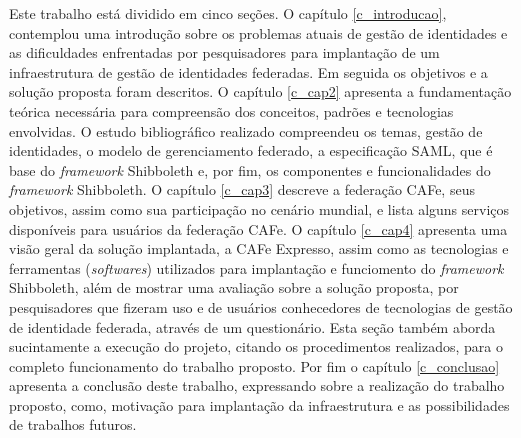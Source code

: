 Este trabalho está dividido em cinco seções. O capítulo \ref{c_introducao}, contemplou uma introdução sobre os problemas atuais de gestão de identidades e as dificuldades enfrentadas por pesquisadores para implantação de um infraestrutura de gestão de identidades federadas. Em seguida os objetivos e a solução proposta foram descritos. O capítulo \ref{c_cap2} apresenta a fundamentação teórica necessária para compreensão dos conceitos, padrões e tecnologias envolvidas. O estudo bibliográfico realizado compreendeu os temas, gestão de identidades, o modelo de gerenciamento federado, a especificação SAML, que é base do \textit{framework} Shibboleth e, por fim, os componentes e funcionalidades do \textit{framework} Shibboleth. O capítulo \ref{c_cap3} descreve a federação CAFe, seus objetivos, assim como sua participação no cenário mundial, e lista alguns serviços disponíveis para usuários da federação CAFe. O capítulo \ref{c_cap4} apresenta uma visão geral da solução implantada, a CAFe Expresso, assim como as tecnologias e ferramentas (\textit{softwares}) utilizados para implantação e funciomento do \textit{framework} Shibboleth, além de mostrar uma avaliação sobre a solução proposta, por pesquisadores que fizeram uso e de usuários conhecedores de tecnologias de gestão de identidade federada, através de um questionário. Esta seção também aborda sucintamente a execução do projeto, citando os procedimentos realizados, para o completo funcionamento do trabalho proposto. Por fim o capítulo \ref{c_conclusao} apresenta a conclusão deste trabalho, expressando sobre a realização do trabalho proposto, como, motivação para implantação da infraestrutura e as possibilidades de trabalhos futuros.